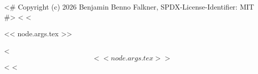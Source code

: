 <# Copyright (c) 2026 Benjamin Benno Falkner, SPDX-License-Identifier: MIT #>
<%
<%
\begin{<< node.args.env >>}
<< node.args.tex >>
\end{<< node.args.env >>}<%
\[
<< node.args.tex >>
\]<%
<%
